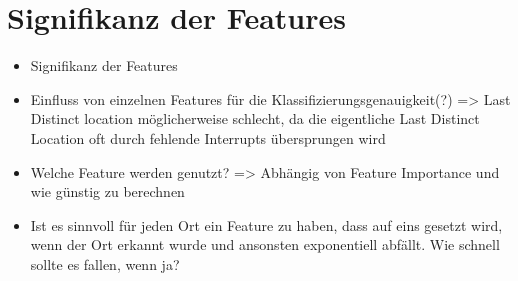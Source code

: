 \section{Signifikanz der Features}
\begin{itemize}
    \item Signifikanz der Features
    \item Einfluss von einzelnen Features für die Klassifizierungsgenauigkeit(?) => Last Distinct location möglicherweise schlecht, da die eigentliche Last Distinct Location oft durch fehlende Interrupts übersprungen wird
    \item Welche Feature werden genutzt? => Abhängig von Feature Importance und wie günstig zu berechnen
    \item Ist es sinnvoll für jeden Ort ein Feature zu haben, dass auf eins gesetzt wird, wenn der Ort erkannt wurde und ansonsten exponentiell abfällt. Wie schnell sollte es fallen, wenn ja?
\end{itemize}